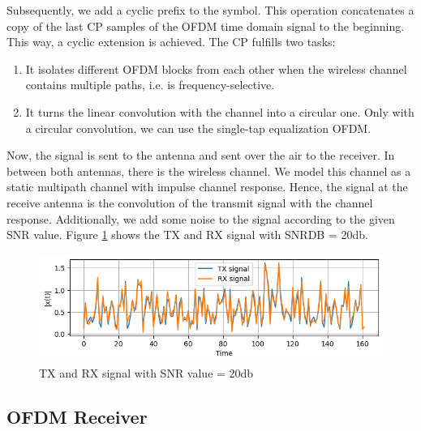 Subsequently, we add a cyclic prefix to the symbol. This operation concatenates a copy of the last CP samples of the OFDM time domain signal to the beginning. This way, a cyclic extension is achieved. The CP fulfills two tasks:
\begin{enumerate}
    \item It isolates different OFDM blocks from each other when the wireless channel contains multiple paths, i.e. is frequency-selective.
    \item It turns the linear convolution with the channel into a circular one. Only with a circular convolution, we can use the single-tap equalization OFDM.
\end{enumerate}


Now, the signal is sent to the antenna and sent over the air to the receiver. In between both antennas, there is the wireless channel. We model this channel as a static multipath channel with impulse channel response. Hence, the signal at the receive antenna is the convolution of the transmit signal with the channel response. Additionally, we add some noise to the signal according to the given SNR value. Figure \ref{tx_rx} shows the TX and RX signal with SNRDB = 20db.

\begin{figure}[htbp]
    \centering
    \includegraphics[width=\textwidth]{../Source/results/tx_rx}
    \caption{TX and RX signal with SNR value = 20db}
    \label{tx_rx}
\end{figure}

\subsection{OFDM Receiver}

